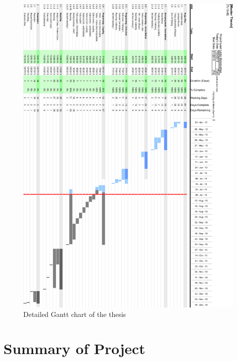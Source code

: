 \begin{figure}[p]
\centering
\includegraphics[scale=0.75]{figures/GanttChart.pdf}
\caption{Detailed Gantt chart of the thesis}
\label{fig:GanttChart}
\end{figure}

\newpage

\section{Summary of Project}


